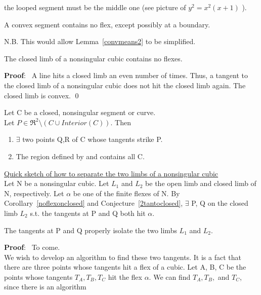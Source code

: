 the looped segment must be the middle one (see picture of $y^{2} = x^{2}(x+1)$
).
\begin{conjecture} \nopagebreak
A convex segment contains no flex, except possibly at a 
boundary.
\end{conjecture}
N.B. This would allow Lemma~\ref{convmeans2} to be simplified.
\begin{corollary} \nopagebreak
\label{noflexonclosed}
The closed limb of a nonsingular cubic contains no flexes.
\end{corollary}
{\bf Proof}: \ A line hits a closed limb an even number of times.
Thus, a tangent to the closed limb of a nonsingular cubic does not hit
the closed limb again.
\hence The closed limb is convex.
\qed
\begin{conjecture} \nopagebreak
\label{2tantoclosed}
Let C be a closed, nonsingular segment or curve. \\
Let $P \in \Re^{2} \setminus (C \cup Interior(C)).$
Then
\begin{enumerate}
\item $\exists$ two points Q,R of C whose tangents strike P.
\item The region defined by  and  contains all C.
\end{enumerate}
\end{conjecture}
\underline{Quick sketch of how to separate the two limbs of a
nonsingular cubic}\vspace{.25in} \\
Let N be a nonsingular cubic.
Let $L_{1}$ and $L_{2}$ be the open limb and closed limb of N, respectively.
Let $\alpha$ be one of the finite flexes of N.
By Corollary~\ref{noflexonclosed} and Conjecture~\ref{2tantoclosed},
$\exists$ P, Q on the closed limb $L_{2}$ s.t. the tangents at P
and Q both hit $\alpha$.
\begin{lemma} \nopagebreak
\label{isolate}
The tangents at P and Q properly isolate the two limbs $L_{1}$ and $L_{2}$.
\end{lemma}
{\bf Proof}: \ To come.
\marginpar{!}
\vspace{.25in} \\
We wish to develop an algorithm to find these two tangents.
It is a fact that there are three 
points whose tangents hit a flex of a cubic.
Let A, B, C be the points whose tangents $T_{A}, T_{B}, T_{C}$ hit
the flex $\alpha$.
We can find $T_{A}, T_{B},$ and $T_{C}$, since there is an algorithm

